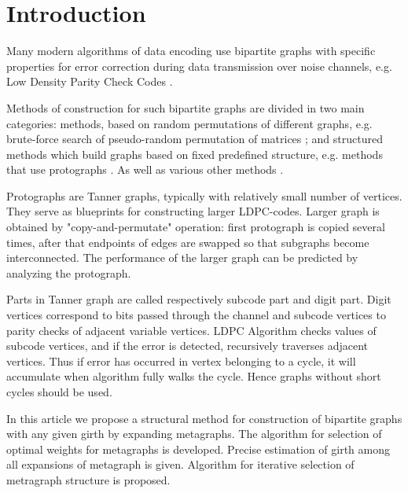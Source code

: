 \documentclass[leqno]{aadmbook}
\begin{document}


\section{Introduction}

Many modern algorithms of data encoding use bipartite graphs with specific properties for error correction during data transmission over noise channels, e.g. Low Density Parity Check Codes \cite{johnson} \cite{ldpc_encoding}. 

Methods of construction for such bipartite graphs are divided in two main categories: methods, based on random permutations of different graphs, e.g. brute-force search of pseudo-random permutation of matrices \cite{gallager}; and structured methods which build graphs based on fixed predefined structure, e.g. methods that use protographs \cite{protographs}. As well as various other methods \cite{margulis_construction} \cite{margulis_critique} \cite{imrich_construction} \cite{algebraic_aproach_to_sc_ldpc} \cite{lifts_of_graphs} \cite{vasic_combinatorial_construction} \cite{Kim2002ExplicitCO}.

Protographs are Tanner graphs, typically with relatively small number of vertices. They serve as blueprints for constructing larger LDPC-codes. Larger graph is obtained by "copy-and-permutate" operation: first protograph is copied several times, after that endpoints of edges are swapped so that subgraphs become interconnected. The performance of the larger graph can be predicted by analyzing the protograph. 

Parts in Tanner graph are called respectively subcode part and digit part. Digit vertices correspond to bits passed through the channel and subcode vertices to parity checks of adjacent variable vertices. LDPC Algorithm checks values of subcode vertices, and if the error is detected, recursively traverses adjacent vertices. Thus if error has occurred in vertex belonging to a cycle, it will accumulate when algorithm fully walks the cycle. Hence graphs without short cycles should be used.

In this article we propose a structural method for construction of bipartite graphs with any given girth by expanding metagraphs. The algorithm for selection of optimal weights for metagraphs is developed. Precise estimation of girth among all expansions of metagraph is given. Algorithm for iterative selection of metragraph structure is proposed.
\end{document}
